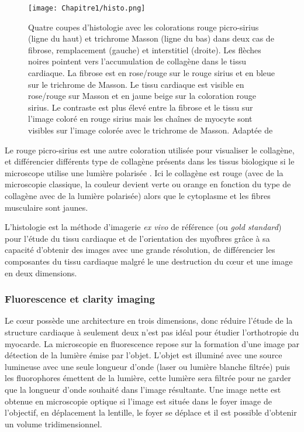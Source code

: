 \begin{figure}[!htbp]
  \begin{center}
    \texttt{[image: Chapitre1/histo.png]}
     \end{center}
    \caption{Quatre coupes d’histologie avec les colorations rouge picro-sirius (ligne du haut) et trichrome Masson (ligne du bas) dans deux cas de fibrose, remplacement (gauche) et interstitiel (droite). Les flèches noires pointent vers l’accumulation de collagène dans le tissu cardiaque. La fibrose est en rose/rouge sur le rouge sirius et en bleue sur le trichrome de Masson. Le tissu cardiaque est visible en rose/rouge sur Masson et en jaune \/ beige sur la coloration rouge sirius. Le contraste est plus élevé entre la fibrose et le tissu sur l’image coloré en rouge sirius mais les chaînes de myocyte sont visibles sur l’image colorée avec le trichrome de Masson. Adaptée de \cite{Qi2022}}
  \label{fig:histo}
\end{figure}

Le rouge picro-sirius est une autre coloration utilisée pour visualiser le collagène, et différencier différents type de collagène présents dans les tissus biologique si le microscope utilise une lumière polarisée\cite{Puchtler_1973} . Ici le collagène est rouge (avec de la microscopie classique, la couleur devient verte ou orange en fonction du type de collagène avec de la lumière polarisée) alors que le cytoplasme et les fibres musculaire sont jaunes.

L’histologie est la méthode d’imagerie \textit{ex vivo} de référence (ou \textit{gold standard}) pour l’étude du tissu cardiaque et de l’orientation des myofbres grâce à sa capacité d’obtenir des images avec une grande résolution, de différencier les composantes du tissu cardiaque malgré le une destruction du cœur et une image en deux dimensions.

\subsubsection{Fluorescence et clarity imaging}

Le cœur possède une architecture en trois dimensions, donc réduire l’étude de la structure cardiaque à seulement deux n’est pas idéal pour étudier l’orthotropie du myocarde. La microscopie en fluorescence repose sur la formation d’une image par détection de la lumière émise par l’objet. L’objet est illuminé avec une source lumineuse avec une seule longueur d’onde (laser ou lumière blanche filtrée) puis les fluorophores émettent de la lumière, cette lumière sera filtrée pour ne garder que la longueur d’onde souhaité dans l’image résultante. Une image nette est obtenue en microscopie optique si l’image est située dans le foyer image de l’objectif, en déplacement la lentille, le foyer se déplace et il est possible d’obtenir un volume tridimensionnel.

